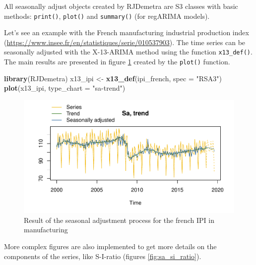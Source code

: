 \documentclass[12pt,a4paper]{article}
\newenvironment{Shaded}{\begin{snugshade}}{\end{snugshade}}
\newcommand{\KeywordTok}[1]{\textcolor[rgb]{0.13,0.29,0.53}{\textbf{#1}}}
\newcommand{\DataTypeTok}[1]{\textcolor[rgb]{0.13,0.29,0.53}{#1}}
\newcommand{\StringTok}[1]{\textcolor[rgb]{0.31,0.60,0.02}{#1}}
\newcommand{\OtherTok}[1]{\textcolor[rgb]{0.56,0.35,0.01}{#1}}
\newcommand{\OperatorTok}[1]{\textcolor[rgb]{0.81,0.36,0.00}{\textbf{#1}}}
\newcommand{\NormalTok}[1]{#1}
\begin{document}
All seasonally adjust objects created by RJDemetra are S3 classes \cite{wickham2014advanced} with basic methods: \texttt{print()}, \texttt{plot()} and
\texttt{summary()} (for regARIMA models).

Let's see an example with the French manufacturing industrial production index
(\url{https://www.insee.fr/en/statistiques/serie/010537903}). The time
series can be seasonally adjusted with the X-13-ARIMA method using the
function \texttt{x13\_def()}. The main results are presented in figure
\ref{fig:sa_ipi} created by the \texttt{plot()} function.

\begin{Shaded}
\begin{Highlighting}[]
\KeywordTok{library}\NormalTok{(RJDemetra)}
\NormalTok{x13_ipi <-}\StringTok{ }\KeywordTok{x13_def}\NormalTok{(ipi_french, }\DataTypeTok{spec =} \StringTok{"RSA3"}\NormalTok{)}
\KeywordTok{plot}\NormalTok{(x13_ipi, }\DataTypeTok{type_chart =} \StringTok{"sa-trend"}\NormalTok{)}
\end{Highlighting}
\end{Shaded}

\begin{figure}[H]
\centering
\includegraphics{NTTS_files/figure-latex/unnamed-chunk-2-1.pdf}
\caption{\label{fig:sa_ipi}Result of the seasonal adjustment process
for the french IPI in manufacturing}
\end{figure}

More complex figures are also implemented to get more details on the
components of the series, like S-I-ratio (figures
\ref{fig:sa_si_ratio}).

\begin{Shaded}
\end{Shaded}
\end{document}
